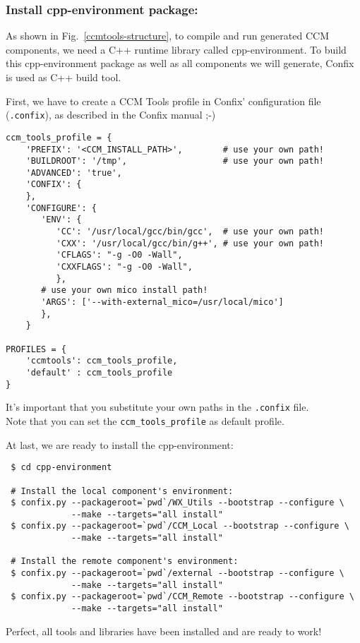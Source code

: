 \subsubsection{Install cpp-environment package:}
As shown in Fig.~\ref{ccmtools-structure}, to compile and run generated CCM
components, we need a C++ runtime library called cpp-environment.
To build this cpp-environment package as well as all components we will generate,
Confix is used as C++ build tool. 

First, we have to create a CCM Tools profile in Confix' configuration file
({\tt .confix}), as described in the Confix manual ;-)
\begin{small}
\begin{verbatim}
ccm_tools_profile = {
    'PREFIX': '<CCM_INSTALL_PATH>',        # use your own path!
    'BUILDROOT': '/tmp',                   # use your own path!
    'ADVANCED': 'true',
    'CONFIX': {
    },
    'CONFIGURE': {
       'ENV': {
          'CC': '/usr/local/gcc/bin/gcc',  # use your own path!
          'CXX': '/usr/local/gcc/bin/g++', # use your own path!    
          'CFLAGS': "-g -O0 -Wall",
          'CXXFLAGS': "-g -O0 -Wall",
          },
       # use your own mico install path!
       'ARGS': ['--with-external_mico=/usr/local/mico']
       },
    }

PROFILES = {
    'ccmtools': ccm_tools_profile,
    'default' : ccm_tools_profile
}
\end{verbatim}
\end{small}
It's important that you substitute your own paths in the {\tt .confix} file. \\
Note that you can set the {\tt ccm\_tools\_profile} as default profile.

At last, we are ready to install the cpp-environment:
\begin{small}
\begin{verbatim}
 $ cd cpp-environment

 # Install the local component's environment:
 $ confix.py --packageroot=`pwd`/WX_Utils --bootstrap --configure \
             --make --targets="all install"
 $ confix.py --packageroot=`pwd`/CCM_Local --bootstrap --configure \
             --make --targets="all install"

 # Install the remote component's environment:
 $ confix.py --packageroot=`pwd`/external --bootstrap --configure \
             --make --targets="all install"
 $ confix.py --packageroot=`pwd`/CCM_Remote --bootstrap --configure \
             --make --targets="all install"
\end{verbatim}
\end{small}

Perfect, all tools and libraries have been installed and are ready to work!






